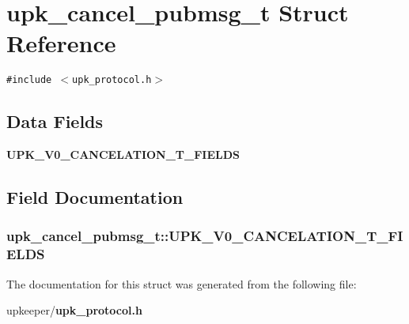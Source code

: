 \section{upk\_\-cancel\_\-pubmsg\_\-t Struct Reference}
\label{structupk__cancel__pubmsg__t}
{\tt \#include $<$upk\_\-protocol.h$>$}

\subsection*{Data Fields}
\begin{CompactItemize}
\item 
\bf{UPK\_\-V0\_\-CANCELATION\_\-T\_\-FIELDS}
\end{CompactItemize}


\subsection{Field Documentation}
\subsubsection{\setlength{\rightskip}{0pt plus 5cm}\bf{upk\_\-cancel\_\-pubmsg\_\-t::UPK\_\-V0\_\-CANCELATION\_\-T\_\-FIELDS}}\label{structupk__cancel__pubmsg__t_faa65f8cbb2d6d82e0a245b9b7cdea32}




The documentation for this struct was generated from the following file:\begin{CompactItemize}
\item 
upkeeper/\bf{upk\_\-protocol.h}\end{CompactItemize}
